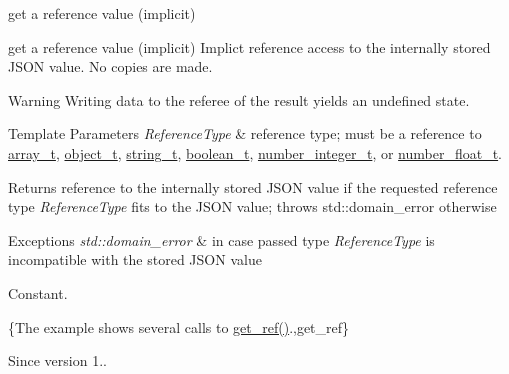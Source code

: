get a reference value (implicit) 

get a reference value (implicit) Implict reference access to the internally stored J\+S\+ON value. No copies are made.

\begin{DoxyWarning}{Warning}
Writing data to the referee of the result yields an undefined state.
\end{DoxyWarning}

\begin{DoxyTemplParams}{Template Parameters}
{\em Reference\+Type} & reference type; must be a reference to \hyperlink{a00025_ab00b882d39306d663c23dab110f5cae0}{array\+\_\+t}, \hyperlink{a00025_a0ac9894c9de8dc551cf2e5f1c605537f}{object\+\_\+t}, \hyperlink{a00025_ab63e618bbb0371042b1bec17f5891f42}{string\+\_\+t}, \hyperlink{a00025_af3bc3e83aa162d7ba4df16a949872723}{boolean\+\_\+t}, \hyperlink{a00025_ac4b10b2364f26ce47bdb9a413ff04a59}{number\+\_\+integer\+\_\+t}, or \hyperlink{a00025_a74a0013e847fdc574b48f931f0e757e1}{number\+\_\+float\+\_\+t}.\\
\hline
\end{DoxyTemplParams}
\begin{DoxyReturn}{Returns}
reference to the internally stored J\+S\+ON value if the requested reference type {\itshape Reference\+Type} fits to the J\+S\+ON value; throws std\+::domain\+\_\+error otherwise
\end{DoxyReturn}

\begin{DoxyExceptions}{Exceptions}
{\em std\+::domain\+\_\+error} & in case passed type {\itshape Reference\+Type} is incompatible with the stored J\+S\+ON value\\
\hline
\end{DoxyExceptions}
Constant.

\{The example shows several calls to {\ttfamily \hyperlink{a00025_a4f332e90f3cae562d0c3fa6ba48f74f9}{get\+\_\+ref()}}.,get\+\_\+ref\}

\begin{DoxySince}{Since}
version 1.. 
\end{DoxySince}
